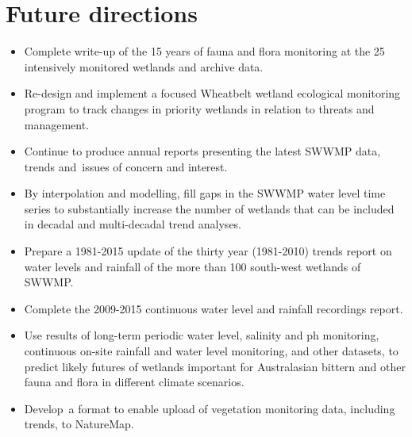\documentclass[version=last,
    paper=a4, %
    10pt, %
    usenames,
    dvipsnames,
    oneside, %
    headings=openany, %
    DIV=15 %
]{scrbook}
\begin{document}
\section*{Future directions}
\begin{itemize}
\itemsep1pt\parskip0pt
\item
  Complete write-up of the 15 years of fauna and flora monitoring at the
  25 intensively monitored wetlands and archive data.
\item
  Re-design and implement a focused Wheatbelt wetland ecological
  monitoring program to track changes in priority wetlands in relation
  to threats and management.
\item
  Continue to produce annual reports presenting the latest SWWMP data,
  trends and~issues of concern and interest.
\item
  By interpolation and modelling, fill gaps in the SWWMP water level
  time series to substantially increase the number of wetlands that can
  be included in decadal and multi-decadal trend analyses.
\item
  Prepare a 1981-2015 update of the thirty year (1981-2010) trends
  report on water levels and rainfall of the more than 100 south-west
  wetlands of SWWMP.
\item
  Complete the 2009-2015 continuous water level and rainfall recordings
  report.
\item
  Use results of long-term periodic water level, salinity and ph
  monitoring, continuous on-site rainfall and water level monitoring,
  and other datasets, to predict likely futures of wetlands important
  for Australasian bittern and other fauna and flora in different
  climate scenarios.
\item
  Develop~a format to enable upload of vegetation monitoring data,
  including trends, to NatureMap.
\end{itemize}



\end{document}

